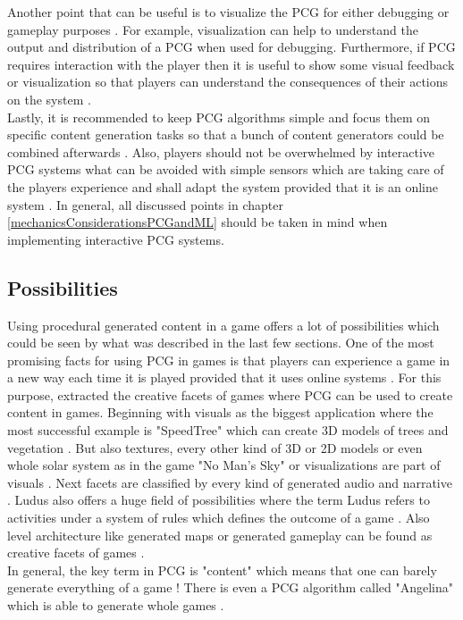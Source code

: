 \documentclass[MGS,Master,english]{twbook}%
\begin{document}
Another point that can be useful is to visualize the PCG for either debugging or gameplay purposes \cite{pcg::book}. For example, visualization can help to understand the output and distribution of a PCG when used for debugging. Furthermore, if PCG requires interaction with the player then it is useful to show some visual feedback or visualization so that players can understand the consequences of their actions on the system \cite{pcg::endlessWeb}. \\
Lastly, it is recommended to keep PCG algorithms simple and focus them on specific content generation tasks so that a bunch of content generators could be combined afterwards \cite{pcg::book}. Also, players should not be overwhelmed by interactive PCG systems what can be avoided with simple sensors which are taking care of the players experience and shall adapt the system provided that it is an online system \cite{pcg::shortHistoryOfDynamicAndPCG}.  In general, all discussed points in chapter \ref{mechanicsConsiderationsPCGandML} should be taken in mind when implementing interactive PCG systems.

\subsection{Possibilities}
Using procedural generated content in a game offers a lot of possibilities which could be seen by what was described in the last few sections. One of the most promising facts for using PCG in games is that players can experience a game in a new way each time it is played provided that it uses online systems \cite{pcg::gamasutra::tips}. For this purpose, \cite{pcg::computationalGameCreativity} extracted the creative facets of games where PCG can be used to create content in games. Beginning with visuals as the biggest application where the most successful example is "SpeedTree" \cite{speedTree} which can create \ac{3D} models of trees and vegetation \cite{pcg::computationalGameCreativity}. But also textures, every other kind of 3D or \ac{2D} models or even whole solar system as in the game "No Man's Sky" \cite{game::noMansSky} or visualizations are part of visuals \cite{pcg::computationalGameCreativity}. Next facets are classified by every kind of generated audio and narrative \cite{pcg::computationalGameCreativity}. Ludus also offers a huge field of possibilities where the term Ludus refers to activities under a system of rules which defines the outcome of a game \cite{pcg::computationalGameCreativity}. Also level architecture like generated maps or generated gameplay can be found as creative facets of games \cite{pcg::computationalGameCreativity}.\\
In general, the key term in PCG is "content" which means that one can barely generate everything of a game \cite{pcg::book}! There is even a PCG algorithm called "Angelina" which is able to generate whole games \cite{pcg::angelina}.
\end{document}
